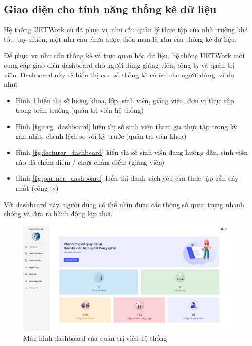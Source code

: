 \documentclass[./../main.tex]{subfiles}
\begin{document}
\hypertarget{thux1ed1ng-kuxea-dux1eef-liux1ec7u}{%
	\subsection{Giao diện cho tính năng thống kê dữ liệu}\label{thux1ed1ng-kuxea-dux1eef-liux1ec7u}}

Hệ thống UETWork cũ đã phục vụ nhu cầu quản lý thực tập của nhà trường khá tốt, tuy nhiên, một nhu cầu chưa được thỏa mãn là nhu cầu thống kê dữ liệu.

Để phục vụ nhu cầu thống kê và trực quan hóa dữ liệu, hệ thống UETWork
mới cung cấp giao diện dashboard cho người dùng giảng viên, công ty và quản trị
viên. Dashboard này sẽ hiển thị con số thống kê có ích cho người dùng, ví
dụ như:


\begin{itemize}
	\item

	      Hình \ref{fig:sys_dashboard} hiển thị số lượng khoa, lớp, sinh viên, giảng viên, đơn vị thực tập trong toàn trường (quản trị viên hệ thống)

	\item

	      Hình \ref{fig:org_dashboard} hiển thị số sinh viên tham gia thực tập trong kỳ gần nhất, chênh lệch so với kỳ trước (quản trị
	      viên khoa)

	\item

	      Hình \ref{fig:lecturer_dashboard} hiển thị số sinh viên đang hướng dẫn, sinh viên nào đã chấm điểm / chưa chấm điểm (giảng viên)

	\item
	      Hình \ref{fig:partner_dashboard} hiển thị danh sách yêu cầu thực tập gần đây nhất (công ty)
\end{itemize}

Với dashboard này, người dùng có thể nhìn được các thông số quan trọng nhanh chóng và đưa ra hành động kịp thời.

\begin{figure}[H]
	\includegraphics[width=\linewidth]{./images/image83.png}
	\caption{Màn hình dashboard của quản trị viên hệ thống}
	\label{fig:sys_dashboard}
\end{figure}
\end{document}
